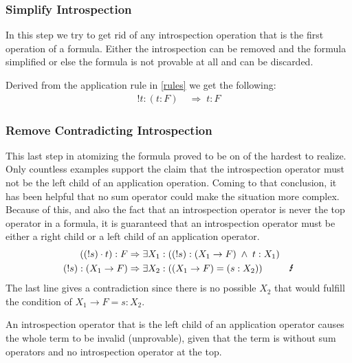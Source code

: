 

\subsubsection{Simplify Introspection}
In this step we try to get rid of any introspection operation that is the first operation of a formula. Either the introspection can be removed and the formula simplified or else the formula is not provable at all and can be discarded.

Derived from the application rule in \ref{rules} we get the following:
\begin{align}\label{sb}
	!t:(t:F) \; & \Rightarrow \; t: F
\end{align}



\subsubsection{Remove Contradicting Introspection}
This last step in atomizing the formula proved to be on of the hardest to realize. Only countless examples support the claim that the introspection operator must not be the left child of an application operation. Coming to that conclusion, it has been helpful that no sum operator could make the situation more complex. Because of this, and also the fact that an introspection operator is never the top operator in a formula, it is guaranteed that an introspection operator must be either a right child or a left child of an application operator.
\begin{align}\label{bb}
	((!s)\cdot t):F  & \Rightarrow \exists X_1 : ((!s): (X_1 \rightarrow F) \; \land \; t: X_1)\\
	(!s): (X_1 \rightarrow F)  &\Rightarrow \exists X_2 : ((X_1 \rightarrow F) = (s:X_2)) & \text{\Lightning}
\end{align}
The last line gives a contradiction since there is no possible $X_2$ that would fulfill the condition of $X_1 \rightarrow F = s:X_2$.

\begin{assertion}
An introspection operator that is the left child of an application operator causes the whole term to be invalid (unprovable), given that the term is without sum operators and no introspection operator at the top.
\end{assertion}



